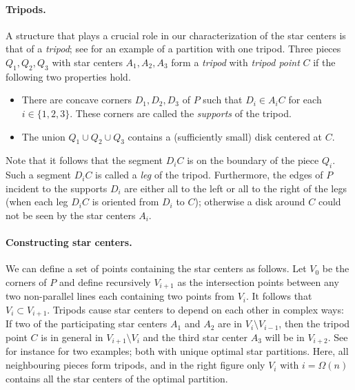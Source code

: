\documentclass{theoretics}
\begin{document}
\paragraph{Tripods.}
A structure that plays a crucial role in our characterization of the star centers is that of a \emph{tripod}; see  for an example of a partition with one tripod.
Three pieces $Q_1,Q_2,Q_3$ with star centers $A_1,A_2,A_3$ form a \emph{tripod} with \emph{tripod point} $C$ if the following two properties hold.
\begin{itemize}
\item
There are concave corners $D_1,D_2,D_3$ of $P$ such that $D_i\in A_iC$ for each $i\in\{1,2,3\}$.
These corners are called the \emph{supports} of the tripod.

\item
The union $Q_1\cup Q_2\cup Q_3$ contains a (sufficiently small) disk centered at $C$.
\end{itemize}
Note that it follows that the segment $D_iC$ is on the boundary of the piece $Q_i$.
Such a segment $D_iC$ is called a \emph{leg} of the tripod.
Furthermore, the edges of $P$ incident to the supports $D_i$ are either all to the left or all to the right of the legs (when each leg $D_iC$ is oriented from $D_i$ to $C$); otherwise a disk around $C$ could not be seen by the star centers $A_i$.

\paragraph{Constructing star centers.}
We can define a set of points containing the star centers as follows.
Let $V_0$ be the corners of $P$ and define recursively $V_{i+1}$ as the intersection points between any two non-parallel lines each containing two points from $V_i$.
It follows that $V_i\subset V_{i+1}$.
Tripods cause star centers to depend on each other in complex ways:
If two of the participating star centers $A_1$ and $A_2$ are in $V_i\setminus V_{i-1}$, then the tripod point $C$ is in general in $V_{i+1}\setminus V_i$ and the third star center $A_3$ will be in $V_{i+2}$.
See for instance  for two examples; both with unique optimal star partitions.
Here, all neighbouring pieces form tripods, and in the right figure only $V_i$ with $i=\Omega(n)$ contains all the star centers of the optimal partition.
\end{document}
